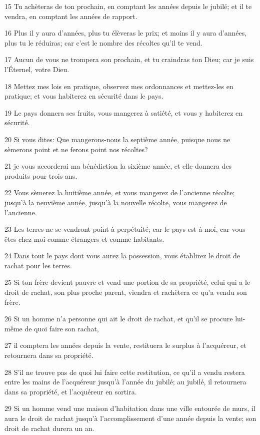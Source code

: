 \par 15 Tu achèteras de ton prochain, en comptant les années depuis le jubilé; et il te vendra, en comptant les années de rapport.
\par 16 Plus il y aura d'années, plus tu élèveras le prix; et moins il y aura d'années, plus tu le réduiras; car c'est le nombre des récoltes qu'il te vend.
\par 17 Aucun de vous ne trompera son prochain, et tu craindras ton Dieu; car je suis l'Éternel, votre Dieu.
\par 18 Mettez mes lois en pratique, observez mes ordonnances et mettez-les en pratique; et vous habiterez en sécurité dans le pays.
\par 19 Le pays donnera ses fruits, vous mangerez à satiété, et vous y habiterez en sécurité.
\par 20 Si vous dites: Que mangerons-nous la septième année, puisque nous ne sèmerons point et ne ferons point nos récoltes?
\par 21 je vous accorderai ma bénédiction la sixième année, et elle donnera des produits pour trois ans.
\par 22 Vous sèmerez la huitième année, et vous mangerez de l'ancienne récolte; jusqu'à la neuvième année, jusqu'à la nouvelle récolte, vous mangerez de l'ancienne.
\par 23 Les terres ne se vendront point à perpétuité; car le pays est à moi, car vous êtes chez moi comme étrangers et comme habitants.
\par 24 Dans tout le pays dont vous aurez la possession, vous établirez le droit de rachat pour les terres.
\par 25 Si ton frère devient pauvre et vend une portion de sa propriété, celui qui a le droit de rachat, son plus proche parent, viendra et rachètera ce qu'a vendu son frère.
\par 26 Si un homme n'a personne qui ait le droit de rachat, et qu'il se procure lui-même de quoi faire son rachat,
\par 27 il comptera les années depuis la vente, restituera le surplus à l'acquéreur, et retournera dans sa propriété.
\par 28 S'il ne trouve pas de quoi lui faire cette restitution, ce qu'il a vendu restera entre les mains de l'acquéreur jusqu'à l'année du jubilé; au jubilé, il retournera dans sa propriété, et l'acquéreur en sortira.
\par 29 Si un homme vend une maison d'habitation dans une ville entourée de murs, il aura le droit de rachat jusqu'à l'accomplissement d'une année depuis la vente; son droit de rachat durera un an.
